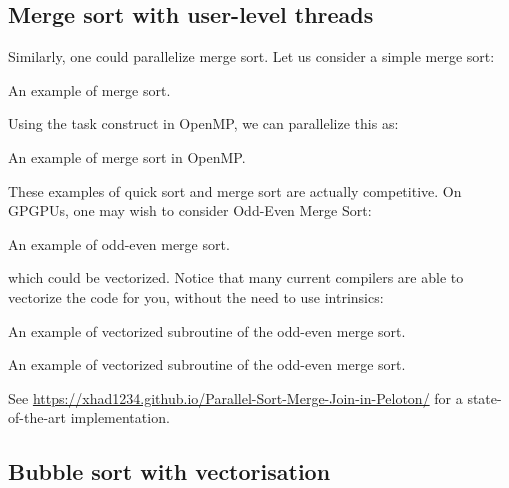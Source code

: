 \subsection{Merge sort with user-level threads}

Similarly, one could parallelize merge sort. Let us consider a simple merge sort:

\begin{codebox}[breakable]{}
    \footnotesize An example of merge sort.
    \tcblower
    \end{codebox}

Using the task construct in OpenMP, we can parallelize this as:

    \begin{codebox}[breakable]{}
        \footnotesize An example of merge sort in OpenMP.
        \tcblower
        \end{codebox}

These examples of quick sort and merge sort are actually competitive. 
 On GPGPUs, one may wish to consider Odd-Even Merge Sort:

 \begin{codebox}[breakable]{}
    \footnotesize An example of odd-even merge sort.
    \tcblower
    \end{codebox}

which could be vectorized. Notice that many current compilers are able to vectorize 
the code for you, without the need to use intrinsics: 

\begin{codebox}[breakable]{}
    \footnotesize An example of vectorized subroutine of the odd-even merge sort.
    \tcblower
    \end{codebox}

    \begin{codebox}[breakable]{}
        \footnotesize An example of vectorized subroutine of the odd-even merge sort.
        \tcblower
        \end{codebox}

See \url{https://xhad1234.github.io/Parallel-Sort-Merge-Join-in-Peloton/} for a state-of-the-art implementation. 

\subsection{Bubble sort with vectorisation}

